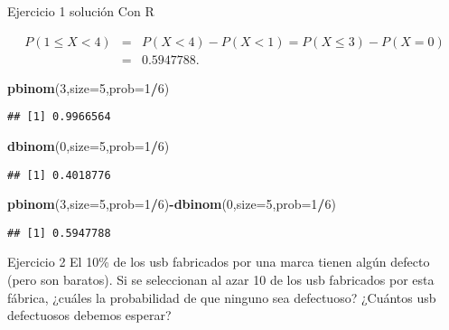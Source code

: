 \documentclass[
  ignorenonframetext,
]{beamer}
\newenvironment{Shaded}{\begin{snugshade}}{\end{snugshade}}
\newcommand{\DataTypeTok}[1]{\textcolor[rgb]{0.13,0.29,0.53}{#1}}
\newcommand{\DecValTok}[1]{\textcolor[rgb]{0.00,0.00,0.81}{#1}}
\newcommand{\KeywordTok}[1]{\textcolor[rgb]{0.13,0.29,0.53}{\textbf{#1}}}
\newcommand{\NormalTok}[1]{#1}
\newcommand{\OperatorTok}[1]{\textcolor[rgb]{0.81,0.36,0.00}{\textbf{#1}}}
\begin{document}
\begin{frame}[fragile]{Ejercicio 1 solución}
\protect\hypertarget{ejercicio-1-soluciuxf3n-2}{}
Con R

\[
\begin{array}{lll}
P(1\leq X< 4)&=& P(X<4)-P(X<1)=P(X\leq 3)-P(X=0)\\&=&0.5947788.
\end{array}
\]

\begin{Shaded}
\begin{Highlighting}[]
\KeywordTok{pbinom}\NormalTok{(}\DecValTok{3}\NormalTok{,}\DataTypeTok{size=}\DecValTok{5}\NormalTok{,}\DataTypeTok{prob=}\DecValTok{1}\OperatorTok{/}\DecValTok{6}\NormalTok{)}
\end{Highlighting}
\end{Shaded}

\begin{verbatim}
## [1] 0.9966564
\end{verbatim}

\begin{Shaded}
\begin{Highlighting}[]
\KeywordTok{dbinom}\NormalTok{(}\DecValTok{0}\NormalTok{,}\DataTypeTok{size=}\DecValTok{5}\NormalTok{,}\DataTypeTok{prob=}\DecValTok{1}\OperatorTok{/}\DecValTok{6}\NormalTok{)}
\end{Highlighting}
\end{Shaded}

\begin{verbatim}
## [1] 0.4018776
\end{verbatim}

\begin{Shaded}
\begin{Highlighting}[]
\KeywordTok{pbinom}\NormalTok{(}\DecValTok{3}\NormalTok{,}\DataTypeTok{size=}\DecValTok{5}\NormalTok{,}\DataTypeTok{prob=}\DecValTok{1}\OperatorTok{/}\DecValTok{6}\NormalTok{)}\OperatorTok{{-}}\KeywordTok{dbinom}\NormalTok{(}\DecValTok{0}\NormalTok{,}\DataTypeTok{size=}\DecValTok{5}\NormalTok{,}\DataTypeTok{prob=}\DecValTok{1}\OperatorTok{/}\DecValTok{6}\NormalTok{)}
\end{Highlighting}
\end{Shaded}

\begin{verbatim}
## [1] 0.5947788
\end{verbatim}
\end{frame}

\begin{frame}{Ejercicio 2}
\protect\hypertarget{ejercicio-2}{}
El 10\% de los usb fabricados por una marca tienen algún defecto (pero
son baratos). Si se seleccionan al azar 10 de los usb fabricados por
esta fábrica, ¿cuáles la probabilidad de que ninguno sea defectuoso?
¿Cuántos usb defectuosos debemos esperar?
\end{frame}
\end{document}
